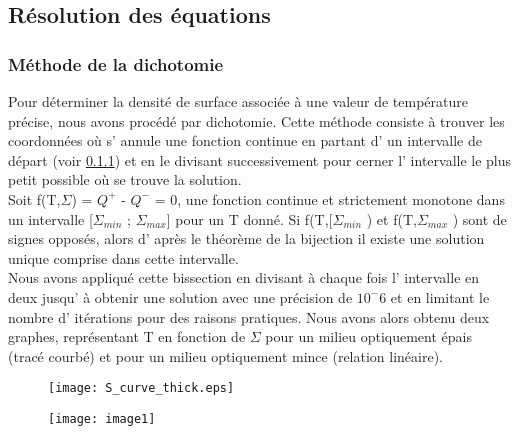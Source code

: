 \subsection{Résolution des équations}
\subsubsection{Méthode de la dichotomie}

Pour déterminer la densité de surface associée à une valeur de température précise, nous avons procédé par dichotomie.
Cette méthode consiste à trouver les coordonnées où s' annule une fonction continue en partant d' un intervalle de départ (voir \ref{}) et en le divisant successivement pour cerner l' intervalle le plus petit possible où se trouve la solution.  
\\
Soit f(T,$\Sigma$) = $Q^+$ - $Q^-$ = 0,  une fonction continue et strictement monotone dans un intervalle [$\Sigma_{min}$ ; $\Sigma_{max}$] pour un T donné. Si f(T,[$\Sigma_{min}$ ) et  f(T,$\Sigma_{max}$ ) sont de signes opposés, alors d' après le théorème de la bijection il existe une solution unique comprise dans cette intervalle. 
\\
Nous avons appliqué cette bissection en divisant à chaque fois l' intervalle en deux jusqu' à obtenir une solution avec une précision de $10^-6$ et en limitant le nombre d' itérations pour des raisons pratiques. Nous avons alors obtenu deux graphes, représentant T en fonction de $\Sigma$ pour un milieu optiquement épais (tracé courbé) et pour un milieu optiquement mince (relation linéaire).
\\

\begin{figure}
\centering
\begin{minipage}{.5\textwidth}
  \centering
  \texttt{[image: S\_curve\_thick.eps]}
  \label{fig:test1}
\end{minipage}%
\begin{minipage}{.5\textwidth}
  \centering
  \texttt{[image: image1]}
  \label{fig:test2}
\end{minipage}
\end{figure}

